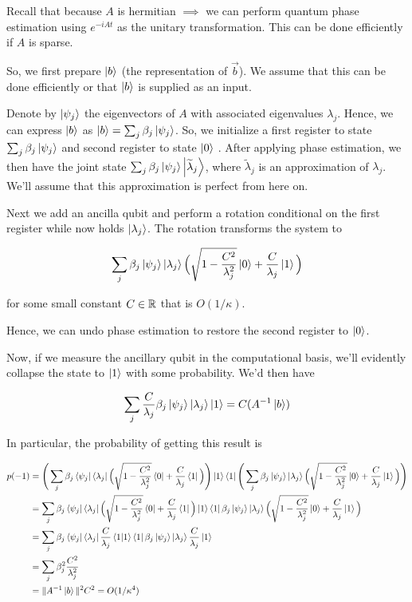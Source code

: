 \documentclass[main.tex]{subfiles}
\begin{document}
Recall that because $A$ is hermitian $\implies$ we can perform quantum phase estimation using $e^{-iAt}$ as the unitary transformation. This can be done efficiently if $A$ is sparse.

So, we first prepare $\ket{b}$ (the representation of $\vec{b}$). We assume that this can be done efficiently or that $\ket{b}$ is supplied as an input.

Denote by $\ket{\psi_j}$ the eigenvectors of $A$ with associated eigenvalues $\lambda_j$. Hence, we can express $\ket{b}$ as $\ket{b} = \sum_j \beta_j \ket{\psi_j}$.  So, we initialize a first register to state $\sum_j \beta_j \ket{\psi_j}$ and second register to state $\ket{0}$ . After applying phase estimation, we then have the joint state $\sum_j \beta_j \ket{\psi_j} \ket{\widetilde{\lambda}_j}$, where $\widetilde{\lambda}_j$ is an approximation of $\lambda_j$. We'll assume that this approximation is perfect from here on. 

Next we add an ancilla qubit and perform a rotation conditional on the first register while now holds $\ket{\lambda_j}$. The rotation transforms the system to

\begin{align*}
\sum_j \beta_j \ket{\psi_j} \ket{\lambda_j} \Big(\sqrt{1-\frac{C^2}{\lambda_j^2}}\ket{0} + \frac{C}{\lambda_j}\ket{1}\Big)
\end{align*}

for some small constant $C \in \mathbb{R}$ that is $O(1/\kappa)$.

Hence, we can undo phase estimation to restore the second register to $\ket{0}$.

Now, if we measure the ancillary qubit in the computational basis, we'll evidently collapse the state to $\ket{1}$ with some probability. We'd then have

\begin{align*}
	\sum_j \frac{C}{\lambda_j} \beta_j \ket{\psi_j} \ket{\lambda_j}\ket{1} = C (A^{-1} \ket{b})
\end{align*}

In particular, the probability of getting this result is 

\begin{align*} 
	p(-1) &= \Bigg(\sum_j \beta_j \bra{\psi_j} \bra{\lambda_j} \Big(\sqrt{1-\frac{C^2}{\lambda_j^2}}\bra{0} + \frac{C}{\lambda_j}\bra{1}\Big) \Bigg)\ket{1}\bra{1} \Bigg(\sum_j \beta_j \ket{\psi_j} \ket{\lambda_j} \Big(\sqrt{1-\frac{C^2}{\lambda_j^2}}\ket{0} + \frac{C}{\lambda_j}\ket{1}\Big)\Bigg) \\
	&= \sum_j \beta_j \bra{\psi_j} \bra{\lambda_j} \Big(\sqrt{1-\frac{C^2}{\lambda_j^2}}\bra{0} + \frac{C}{\lambda_j}\bra{1}\Big) \ket{1}\bra{1} \beta_j \ket{\psi_j} \ket{\lambda_j} \Big(\sqrt{1-\frac{C^2}{\lambda_j^2}}\ket{0} + \frac{C}{\lambda_j}\ket{1}\Big) \\
	&= \sum_j \beta_j \bra{\psi_j} \bra{\lambda_j} \frac{C}{\lambda_j}\bra{1}\ket{1}\bra{1} \beta_j \ket{\psi_j} \ket{\lambda_j} \frac{C}{\lambda_j}\ket{1} \\
	&= \sum_j \beta_j^2 \frac{C^2}{\lambda_j^2} \\
	&= \| A^{-1} \ket{b} \|^2 C^2 = O(1/\kappa^4)
\end{align*} 
\end{document}
